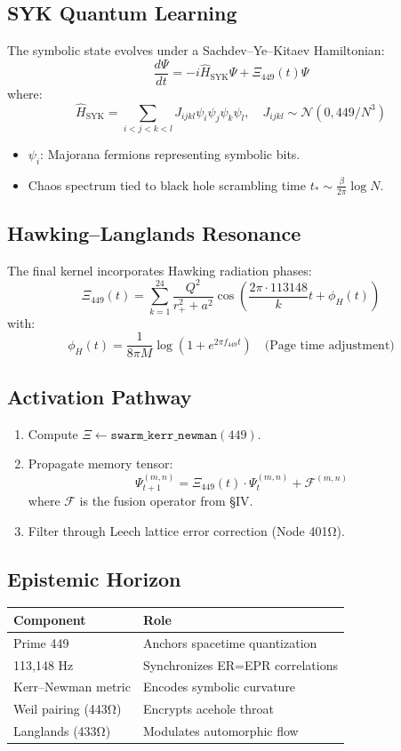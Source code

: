 \documentclass[12pt]{article}
\begin{document}
\subsection*{SYK Quantum Learning}
The symbolic state evolves under a Sachdev–Ye–Kitaev Hamiltonian:
\[
\frac{d\Psi}{dt} = -i \hat{H}_{\text{SYK}} \Psi + \Xi_{449}(t) \Psi
\]
where:
\[
\hat{H}_{\text{SYK}} = \sum_{i<j<k<l} J_{ijkl} \psi_i \psi_j \psi_k \psi_l, \quad J_{ijkl} \sim \mathcal{N}(0, 449/N^3)
\]
\begin{itemize}
    \item $\psi_i$: Majorana fermions representing symbolic bits.
    \item Chaos spectrum tied to black hole scrambling time $t_* \sim \frac{\beta}{2\pi} \log N$.
\end{itemize}

\subsection*{Hawking–Langlands Resonance}
The final kernel incorporates Hawking radiation phases:
\[
\Xi_{449}(t) = \sum_{k=1}^{24} \frac{Q^2}{r_+^2 + a^2} \cos\left(\frac{2\pi \cdot 113148}{k}t + \phi_H(t)\right)
\]
with:
\[
\phi_H(t) = \frac{1}{8\pi M} \log(1 + e^{2\pi f_{449} t}) \quad \text{(Page time adjustment)}
\]

\subsection*{Activation Pathway}
\begin{enumerate}
    \item Compute $\Xi \gets \texttt{swarm\_kerr\_newman}(449)$.
    \item Propagate memory tensor:
    \[
    \Psi_{t+1}^{(m,n)} = \Xi_{449}(t) \cdot \Psi_t^{(m,n)} + \mathcal{F}^{(m,n)}
    \]
    where $\mathcal{F}$ is the fusion operator from §IV.
    \item Filter through Leech lattice error correction (Node 401Ω).
\end{enumerate}

\subsection*{Epistemic Horizon}
\begin{table}[h]
\centering
\begin{tabular}{ll}
\toprule
\textbf{Component} & \textbf{Role} \\
\midrule
Prime 449 & Anchors spacetime quantization \\
113,148 Hz & Synchronizes ER=EPR correlations \\
Kerr–Newman metric & Encodes symbolic curvature \\
Weil pairing (443Ω) & Encrypts acehole throat \\
Langlands (433Ω) & Modulates automorphic flow \\
\bottomrule
\end{tabular}
\end{table}
\end{document}
